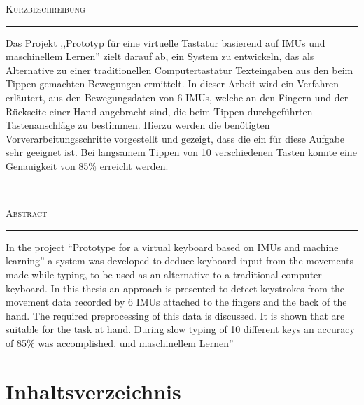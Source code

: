 \cleardoublepage
\hspace{0pt}
\vfill
\begin{center}
\begin{minipage}{0.7\textwidth}
    \begin{center}
        \textsc{Kurzbeschreibung}
    \end{center}
    \vspace{-2ex}
    \noindent\rule[0.5ex]{\linewidth}{0.5pt}
    Das Projekt ,,Prototyp für eine virtuelle Tastatur basierend auf IMUs und maschinellem Lernen'' zielt darauf ab, ein System zu entwickeln, das als Alternative zu einer traditionellen Computertastatur Texteingaben aus den beim Tippen gemachten Bewegungen ermittelt. In dieser Arbeit wird ein Verfahren erläutert, aus den Bewegungsdaten von 6 IMUs, welche an den Fingern und der Rückseite einer Hand angebracht sind, die beim Tippen durchgeführten Tastenanschläge zu bestimmen. Hierzu werden die benötigten Vorverarbeitungsschritte vorgestellt und gezeigt, dass die ein  für diese Aufgabe sehr geeignet ist. Bei langsamem Tippen von 10 verschiedenen Tasten konnte eine Genauigkeit von 85\% erreicht werden.
\end{minipage}
\\[2cm]
    \begin{minipage}{0.7\textwidth}
        \begin{center}
            \textsc{Abstract}
        \end{center}
        \vspace{-2ex}
        \noindent\rule[0.5ex]{\linewidth}{0.5pt}
        In the project ``Prototype for a virtual keyboard based on IMUs and machine learning'' a system was developed to deduce keyboard input from the movements made while typing, to be used as an alternative to a traditional computer keyboard. In this thesis an approach is presented to detect keystrokes from the movement data recorded by 6 IMUs attached to the fingers and the back of the hand. The required preprocessing of this data is discussed. It is shown that  are suitable for the task at hand. During slow typing of 10 different keys an accuracy of 85\% was accomplished.
und maschinellem Lernen''
    \end{minipage}
\end{center}
\vfill
\hspace{0pt}
\pagebreak



\chapter{Inhaltsverzeichnis}
\makeatletter
{
\renewcommand{\baselinestretch}{0.75}\normalsize
{}
}
\makeatother


